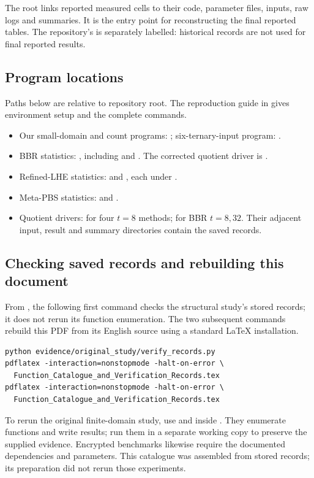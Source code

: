 \documentclass[a4paper,10pt]{article}
\begin{document}
The root  links reported measured cells to their code, parameter files, inputs, raw logs and summaries. It is the entry point for reconstructing the final reported tables. The repository's  is separately labelled: historical records are not used for final reported results.

\subsection{Program locations}
Paths below are relative to repository root. The reproduction guide in  gives environment setup and the complete commands.
\begin{itemize}
\item Our small-domain and count programs: ; six-ternary-input program: .
\item BBR statistics: , including  and . The corrected quotient driver is .
\item Refined-LHE statistics:  and , each under .
\item Meta-PBS statistics:  and .
\item Quotient drivers:  for four $t=8$ methods;  for BBR $t=8,32$. Their adjacent input, result and summary directories contain the saved records.
\end{itemize}

\subsection{Checking saved records and rebuilding this document}
From , the following first command checks the structural study's stored records; it does not rerun its function enumeration. The two subsequent commands rebuild this PDF from its English source using a standard \LaTeX{} installation.
\begin{verbatim}
python evidence/original_study/verify_records.py
pdflatex -interaction=nonstopmode -halt-on-error \
  Function_Catalogue_and_Verification_Records.tex
pdflatex -interaction=nonstopmode -halt-on-error \
  Function_Catalogue_and_Verification_Records.tex
\end{verbatim}
To rerun the original finite-domain study, use  and  inside . They enumerate functions and write results; run them in a separate working copy to preserve the supplied evidence. Encrypted benchmarks likewise require the documented dependencies and parameters. This catalogue was assembled from stored records; its preparation did not rerun those experiments.
\end{document}
